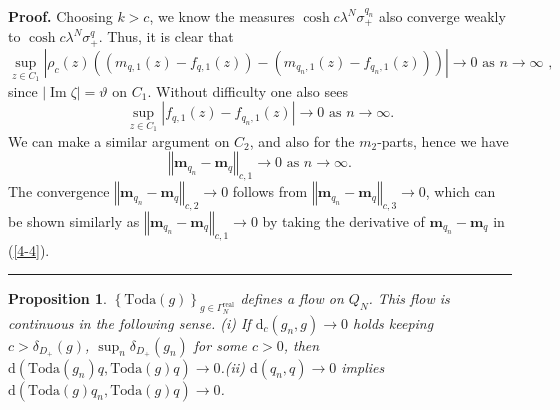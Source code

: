 \documentclass[a4paper]{article}%
\newtheorem{proposition}{Proposition}
\newenvironment{proof}[1][Proof]{\noindent\textbf{#1.} }{\ \rule{0.5em}{0.5em}}
\begin{document}
\begin{proof}
Choosing $k>c$, we know the measures $\cosh c\lambda^{N}\sigma_{+}^{q_{n}}$
also converge weakly to $\cosh c\lambda^{N}\sigma_{+}^{q}$. Thus, it is clear
that
\[
\sup_{z\in C_{1}}\left\vert \rho_{c}(z)\left(  \left(  m_{q,1}(z)-f_{q,1}%
(z)\right)  -\left(  m_{q_{n},1}(z)-f_{q_{n},1}(z)\right)  \right)
\right\vert \rightarrow0\text{ \ as }n\rightarrow\infty\text{ ,}%
\]
since $\left\vert \operatorname{Im}\zeta\right\vert =\vartheta$ on $C_{1}$.
Without difficulty one also sees%
\[
\sup_{z\in C_{1}}\left\vert f_{q,1}(z)-f_{q_{n},1}(z)\right\vert
\rightarrow0\text{ \ as }n\rightarrow\infty\text{.}%
\]
We can make a similar argument on $C_{2}$, and also for the $m_{2}$-parts,
hence we have%
\[
\left\Vert \boldsymbol{m}_{q_{n}}-\boldsymbol{m}_{q}\right\Vert _{c,1}%
\rightarrow0\text{ \ as \ }n\rightarrow\infty\text{.}%
\]
The convergence $\left\Vert \boldsymbol{m}_{q_{n}}-\boldsymbol{m}%
_{q}\right\Vert _{c,2}\rightarrow0$ follows from $\left\Vert \boldsymbol{m}%
_{q_{n}}-\boldsymbol{m}_{q}\right\Vert _{c,3}\rightarrow0$, which can be shown
similarly as $\left\Vert \boldsymbol{m}_{q_{n}}-\boldsymbol{m}_{q}\right\Vert
_{c,1}\rightarrow0$ by taking the derivative of $\boldsymbol{m}_{q_{n}%
}-\boldsymbol{m}_{q}$ in (\ref{4-4}).\bigskip
\end{proof}

\begin{proposition}
\label{p2}$\left\{  \mathrm{Toda}\left(  g\right)  \right\}  _{g\in\Gamma
_{N}^{\operatorname{real}}}$ defines a flow on $Q_{N}$. This flow is
continuous in the following sense. \newline(i) If $\mathrm{d}_{c}\left(
g_{n},g\right)  \rightarrow0$ holds keeping $c>\delta_{D_{+}}\left(  g\right)
$, $\sup_{n}\delta_{D_{+}}\left(  g_{n}\right)  $ for some $c>0$, then
$\mathrm{d}\left(  \mathrm{Toda}\left(  g_{n}\right)  q,\mathrm{Toda}\left(
g\right)  q\right)  \rightarrow0$.\newline(ii) $\mathrm{d}\left(
q_{n},q\right)  \rightarrow0$ implies $\mathrm{d}\left(  \mathrm{Toda}\left(
g\right)  q_{n},\mathrm{Toda}\left(  g\right)  q\right)  \rightarrow0$.
\end{proposition}
\end{document}
